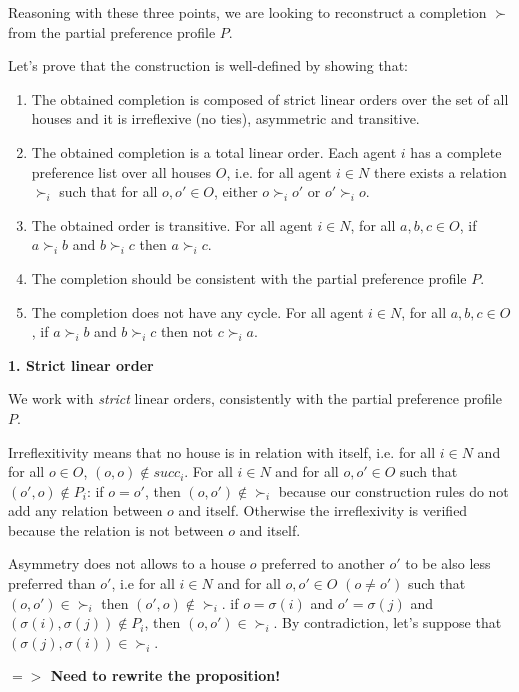 \documentclass{article}
\begin{document}
Reasoning with these three points, we are looking to reconstruct a completion $\succ$ from the partial preference profile $P$.

Let's prove that the construction is well-defined by showing that:
\begin{enumerate}
    \item The obtained completion is composed of strict linear orders over the set of all houses and it is irreflexive (no ties), asymmetric and transitive.
    \item The obtained completion is a total linear order. Each agent $i$ has a complete preference list over all houses $O$, i.e. for all agent $i \in N $ there exists a relation $\succ_i$ such that for all $o, o' \in O$, either $o \succ_i o'$ or $o' \succ_i o$.
    \item The obtained order is transitive. For all agent $i \in N$, for all $a, b, c \in O$, if $a \succ_i b$ and $b \succ_i c$ then $a \succ_i c$.
    \item The completion should be consistent with the partial preference profile $P$.
    \item The completion does not have any cycle. For all agent $i \in N$, for all $a, b, c \in O$, if $a \succ_i b$ and $b \succ_i c$ then not $c \succ_i a$.
\end{enumerate}


\textbf{1. Strict linear order}

We work with \emph{strict} linear orders, consistently with the partial preference profile $P$.


Irreflexitivity means that no house is in relation with itself, i.e. for all $i \in N$ and for all $o \in O$, $(o, o) \notin succ_i$.
For all $i \in N$ and for all $o, o' \in O$ such that $(o', o) \notin P_i$: 
if $o=o'$, then $(o, o') \notin \succ_i$ because our construction rules do not add any relation between $o$ and itself.
Otherwise the irreflexivity is verified because the relation is not between $o$ and itself.


Asymmetry does not allows to a house $o$ preferred to another $o'$ to be also less preferred than $o'$, i.e 
for all $i \in N$ and for all $o, o' \in O$ $(o \neq o')$ such that $(o, o') \in \succ_i$ then $(o', o) \notin \succ_i$.
if $o = \sigma(i)$ and $o' = \sigma(j)$ and $(\sigma(i), \sigma(j)) \notin P_i$, then $(o, o') \in \succ_i$. 
By contradiction, let's suppose that $(\sigma(j), \sigma(i)) \in \succ_i$. 

\textbf{$=>$ Need to rewrite the proposition!}
\end{document}
